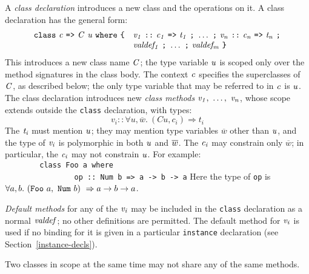 \noindent
A {\em class declaration} introduces a new class and the operations on it.
A class declaration has the general form:
\[\begin{array}{rl}
\mbox{$\it \makebox{\tt class}\ c\ \makebox{\tt =>}\ C\ u\ \makebox{\tt where}\ \makebox{\tt {\char'173}}$}&\mbox{$\it v_1\ \makebox{\tt ::}\ c_1\ \makebox{\tt =>}\ t_1\ \makebox{\tt ;}\ \ldots \ \makebox{\tt ;}\ v_n\ \makebox{\tt ::}\ c_n\ \makebox{\tt =>}\ t_n\ \makebox{\tt ;}$}\\
                                &\mbox{$\it valdef_1\ \makebox{\tt ;}\ \ldots \ \makebox{\tt ;}\ valdef_m\ \makebox{\tt {\char'175}}$}
\end{array}\]
This introduces a new class name \mbox{$\it C$}; the type variable \mbox{$\it u$} is
scoped only over the method signatures in the class body.
The context \mbox{$\it c$} specifies the superclasses of \mbox{$\it C$}, as
described below; the only type variable that may be referred to in \mbox{$\it c$}
is \mbox{$\it u$}.
The class declaration introduces new {\em class methods}
\mbox{$\it v_1,\ \ldots ,\ v_n$}, whose scope extends outside the \mbox{\tt class} declaration,
with types:
\[
v_i :: \forall u,\overline{w}.~(C u, c_i) \Rightarrow t_i
\]
The \mbox{$\it t_i$} must mention \mbox{$\it u$}; they may mention type variables
$\overline{w}$ other than \mbox{$\it u$}, and the type of \mbox{$\it v_i$} is
polymorphic in both \mbox{$\it u$} and $\overline{w}\/$.
The \mbox{$\it c_i$} may constrain only $\overline{w}$; in particular,
the \mbox{$\it c_i$} may not constrain \mbox{$\it u$}.
For example:
\bprog
\mbox{\tt \ \ \ \ \ \ \ \ class\ Foo\ a\ where}\\
\mbox{\tt \ \ \ \ \ \ \ \ \ \ \ \ \ \ \ \ op\ ::\ Num\ b\ =>\ a\ ->\ b\ ->\ a}
\eprog
Here the type of \mbox{\tt op} is
$\forall a, b.~(\mbox{\tt Foo}~a,~\mbox{\tt Num}~b)~ \Rightarrow a \rightarrow b \rightarrow a$.

{\em Default methods}
for any of the \mbox{$\it v_i$} may be included in the
\mbox{\tt class} declaration as a normal \mbox{$\it valdef$}; no other definitions are
permitted.  The default method for \mbox{$\it v_i$} is used if no binding for it
is given in a particular \mbox{\tt instance} declaration (see
Section~\ref{instance-decls}).

Two classes in scope at the same time may not share any of the same
methods.

